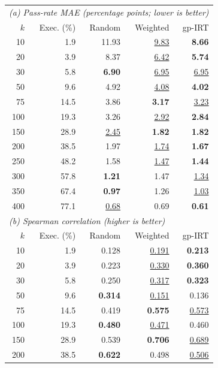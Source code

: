 \begin{table}[t]
  \centering
  \small
  \setlength{\tabcolsep}{3.5pt}
  \begin{tabular}{rrrrr}
    \toprule
    \multicolumn{5}{l}{\textit{(a) Pass-rate MAE (percentage points; lower is better)}} \\
    $k$ & Exec. (\%) & Random & Weighted & gp-IRT \\
    \midrule
    10 & 1.9 & 11.93 & \underline{9.83} & \textbf{8.66} \\
    20 & 3.9 & 8.37 & \underline{6.42} & \textbf{5.74} \\
    30 & 5.8 & \textbf{6.90} & \underline{6.95} & \underline{6.95} \\
    50 & 9.6 & 4.92 & \underline{4.08} & \textbf{4.02} \\
    75 & 14.5 & 3.86 & \textbf{3.17} & \underline{3.23} \\
    100 & 19.3 & 3.26 & \underline{2.92} & \textbf{2.84} \\
    150 & 28.9 & \underline{2.45} & \textbf{1.82} & \textbf{1.82} \\
    200 & 38.5 & 1.97 & \underline{1.74} & \textbf{1.67} \\
    250 & 48.2 & 1.58 & \underline{1.47} & \textbf{1.44} \\
    300 & 57.8 & \textbf{1.21} & 1.47 & \underline{1.34} \\
    350 & 67.4 & \textbf{0.97} & 1.26 & \underline{1.03} \\
    400 & 77.1 & \underline{0.68} & 0.69 & \textbf{0.61} \\
    \midrule
    \multicolumn{5}{l}{\textit{(b) Spearman correlation (higher is better)}} \\
    $k$ & Exec. (\%) & Random & Weighted & gp-IRT \\
    \midrule
    10 & 1.9 & 0.128 & \underline{0.191} & \textbf{0.213} \\
    20 & 3.9 & 0.223 & \underline{0.330} & \textbf{0.360} \\
    30 & 5.8 & 0.250 & \underline{0.317} & \textbf{0.323} \\
    50 & 9.6 & \textbf{0.314} & \underline{0.151} & 0.136 \\
    75 & 14.5 & 0.419 & \textbf{0.575} & \underline{0.573} \\
    100 & 19.3 & \textbf{0.480} & \underline{0.471} & 0.460 \\
    150 & 28.9 & 0.539 & \textbf{0.706} & \underline{0.689} \\
    200 & 38.5 & \textbf{0.622} & 0.498 & \underline{0.506} \\

\end{tabular}
\end{table}
